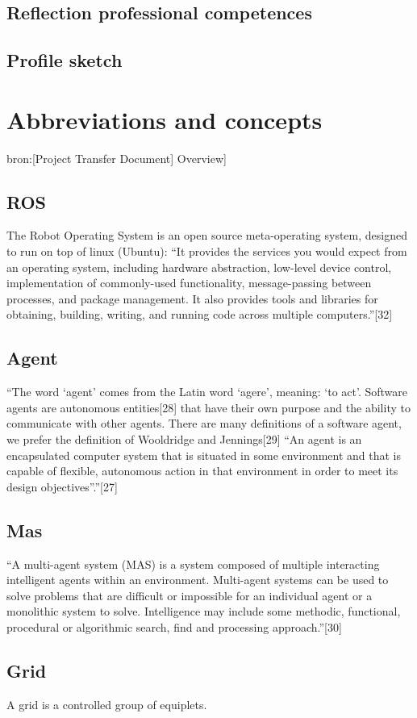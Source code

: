 \documentclass[12pt,a4paper]{report}
\begin{document}
\section{Reflection professional competences}

\section{Profile sketch}

\chapter{Abbreviations and concepts}
bron:[Project Transfer Document] Overview]
\section{ROS}
The Robot Operating System is an open source meta-operating system, designed to run on top of linux (Ubuntu): “It provides the services you would expect from an operating system, including hardware abstraction, low-level device control, implementation of commonly-used functionality, message-passing between processes, and package management. It also provides tools and libraries for obtaining, building, writing, and running code across multiple computers.”[32]
\section{Agent}
“The word ‘agent’ comes from the Latin word ‘agere’, meaning: ‘to act’. Software agents are autonomous entities[28] that have their own purpose and the ability to communicate with other agents. There are many definitions of a software agent, we prefer the definition of Wooldridge and Jennings[29] “An agent is an encapsulated computer system that is situated in some environment and that is capable of flexible, autonomous action in that environment in
order to meet its design objectives”.”[27]
\section{Mas}
“A multi-agent system (MAS) is a system composed of multiple interacting intelligent agents within an environment. Multi-agent systems can be used to solve problems that are difficult or impossible for an individual agent or a monolithic system to solve. Intelligence may include some methodic, functional, procedural or algorithmic search, find and processing approach.”[30]
\section{Grid}
A grid is a controlled group of equiplets.
\end{document}
